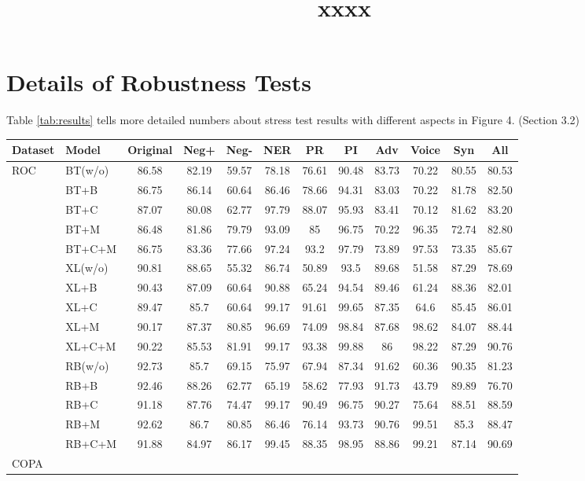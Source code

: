 \documentclass[11pt,a4paper]{article}
\title{xxxx}
\author{}
\date{}
\newcommand{\tabref}[1]{Table \ref{#1}}
\begin{document}
\appendix
\section{Details of Robustness Tests}
\tabref{tab:results} tells more detailed numbers about 
stress test results with different aspects in Figure 4. (Section 3.2)


\begin{table}[th]
\scriptsize
\centering
\begin{tabular}{ll|c|ccccccccc}\hline
\toprule  
\textbf{Dataset}&\textbf{Model}&\textbf{Original} &\textbf{Neg+} & \textbf{Neg-} &\textbf{NER} &\textbf{PR} &\textbf{PI} 
                                               &\textbf{Adv}&\textbf{Voice}&\textbf{Syn}&\textbf{All}
                                               \\ 
 \hline
 \multirow{13}{*}{ROC} 
&BT(w/o)&86.58&82.19&59.57&78.18&76.61&90.48&83.73&70.22&80.55&80.53 \\                                                 
&BT+B&86.75&86.14&60.64&86.46&78.66&94.31&83.03&70.22&81.78&82.50 \\
&BT+C&87.07&80.08&62.77&97.79&88.07&95.93&83.41&70.12&81.62&83.20 \\
&BT+M&86.48&81.86&79.79&93.09&85&96.75&70.22&96.35&72.74&82.80 \\
&BT+C+M&86.75&83.36&77.66&97.24&93.2&97.79&73.89&97.53&73.35&85.67 \\
\cline{2-12}
&XL(w/o)&90.81&88.65&55.32&86.74&50.89&93.5&89.68&51.58&87.29&78.69 \\
&XL+B&90.43&87.09&60.64&90.88&65.24&94.54&89.46&61.24&88.36&82.01 \\
&XL+C&89.47&85.7&60.64&99.17&91.61&99.65&87.35&64.6&85.45&86.01 \\
&XL+M&90.17&87.37&80.85&96.69&74.09&98.84&87.68&98.62&84.07&88.44 \\
&XL+C+M&90.22&85.53&81.91&99.17&93.38&99.88&86&98.22&87.29&90.76 \\
\cline{2-12}
&RB(w/o)&92.73&85.7&69.15&75.97&67.94&87.34&91.62&60.36&90.35&81.23 \\
&RB+B&92.46&88.26&62.77&65.19&58.62&77.93&91.73&43.79&89.89&76.70 \\
&RB+C&91.18&87.76&74.47&99.17&90.49&96.75&90.27&75.64&88.51&88.59 \\
&RB+M&92.62&86.7&80.85&86.46&76.14&93.73&90.76&99.51&85.3&88.47 \\
&RB+C+M&91.88&84.97&86.17&99.45&88.35&98.95&88.86&99.21&87.14&90.69 \\
\hline
\multirow{13}{*}{COPA} 


\end{tabular}
\end{table}
\end{document}
